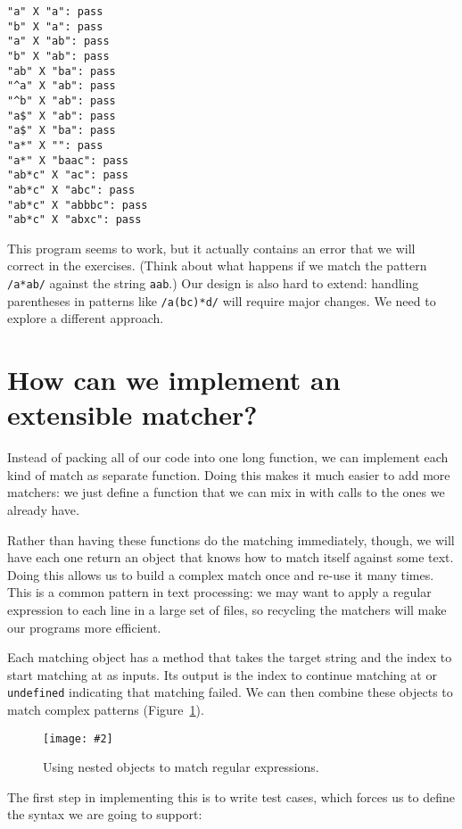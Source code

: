\documentclass[krantzl]{krantz}
\newcommand{\figpdf}[4]{\begin{figure}%
\centering%
\texttt{[image: \#2]}%
\caption{#3}%
\label{#1}%
\end{figure}}
\newcommand{\figref}[1]{Figure~\ref{#1}}
\begin{document}
\begin{lstlisting}[frame=tblr,backgroundcolor=\color{black!5}]
"a" X "a": pass
"b" X "a": pass
"a" X "ab": pass
"b" X "ab": pass
"ab" X "ba": pass
"^a" X "ab": pass
"^b" X "ab": pass
"a$" X "ab": pass
"a$" X "ba": pass
"a*" X "": pass
"a*" X "baac": pass
"ab*c" X "ac": pass
"ab*c" X "abc": pass
"ab*c" X "abbbc": pass
"ab*c" X "abxc": pass
\end{lstlisting}



This program seems to work,
but it actually contains an error that we will correct in the exercises.
(Think about what happens if we match the pattern \texttt{/a*ab/} against the string \texttt{{\textquotesingle}aab{\textquotesingle}}.)
Our design is also hard to extend:
handling parentheses in patterns like \texttt{/a(bc)*d/} will require major changes.
We need to explore a different approach.

\section{How can we implement an extensible matcher?}\label{pattern-matching-extensible}


Instead of packing all of our code into one long function,
we can implement each kind of match as separate function.
Doing this makes it much easier to add more matchers:
we just define a function that we can mix in with calls to the ones we already have.


Rather than having these functions do the matching immediately,
though,
we will have each one return an object that knows how to match itself against some text.
Doing this allows us to build a complex match once and re-use it many times.
This is a common pattern in text processing:
we may want to apply a regular expression to each line in a large set of files,
so recycling the matchers will make our programs more efficient.


Each matching object has a method that takes the target string and the index to start matching at as inputs.
Its output is the index to continue matching at
or \texttt{undefined} indicating that matching failed.
We can then combine these objects to match complex patterns
(\figref{pattern-matching-regex-objects}).

\figpdf{pattern-matching-regex-objects}{./pattern-matching/regex-objects.pdf}{Using nested objects to match regular expressions.}{0.6}


The first step in implementing this is to write test cases,
which forces us to define the syntax we are going to support:
\end{document}

